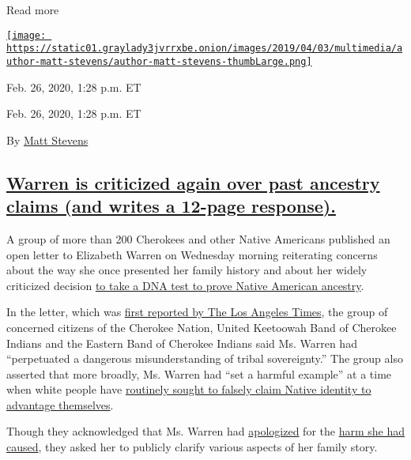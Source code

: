 Read more

\href{https://www.nytimes3xbfgragh.onion/by/matt-stevens}{\texttt{[image: https://static01.graylady3jvrrxbe.onion/images/2019/04/03/multimedia/author-matt-stevens/author-matt-stevens-thumbLarge.png]}}

Feb. 26, 2020, 1:28 p.m. ET

Feb. 26, 2020, 1:28 p.m. ET

By \href{https://www.nytimes3xbfgragh.onion/by/matt-stevens}{Matt
Stevens}

\hypertarget{warren-is-criticized-again-over-past-ancestry-claims-and-writes-a-12-page-response}{%
\subsection{\texorpdfstring{\protect\hyperlink{warren-is-criticized-again-over-past-ancestry-claims-and-writes-a-12-page-response}{Warren
is criticized again over past ancestry claims (and writes a 12-page
response).}}{Warren is criticized again over past ancestry claims (and writes a 12-page response).}}\label{warren-is-criticized-again-over-past-ancestry-claims-and-writes-a-12-page-response}}

A group of more than 200 Cherokees and other Native Americans published
an open letter to Elizabeth Warren on Wednesday morning reiterating
concerns about the way she once presented her family history and about
her widely criticized decision
\href{https://www.nytimes3xbfgragh.onion/2018/12/06/us/politics/elizabeth-warren-dna-test-2020.html}{to
take a DNA test to prove Native American ancestry}.

In the letter, which was
\href{https://www.latimes.com/politics/story/2020-02-26/elizabeth-warren-again-is-pressed-on-past-claims-of-native-american-heritage}{first
reported by The Los Angeles Times}, the group of concerned citizens of
the Cherokee Nation, United Keetoowah Band of Cherokee Indians and the
Eastern Band of Cherokee Indians said Ms. Warren had ``perpetuated a
dangerous misunderstanding of tribal sovereignty.'' The group also
asserted that more broadly, Ms. Warren had ``set a harmful example'' at
a time when white people have
\href{https://www.latimes.com/local/lanow/la-na-cherokee-minority-contracts-20190626-story.html}{routinely
sought to falsely claim Native identity to advantage themselves}.

Though they acknowledged that Ms. Warren had
\href{https://www.nytimes3xbfgragh.onion/2019/02/01/us/politics/elizabeth-warren-cherokee-dna.html}{apologized}
for the
\href{https://www.nytimes3xbfgragh.onion/2019/08/19/us/politics/elizabeth-warren-native-american.html}{harm
she had caused}, they asked her to publicly clarify various aspects of
her family story.

